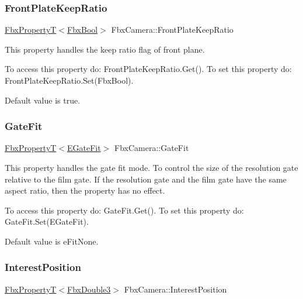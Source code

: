 \subsubsection{\texorpdfstring{Front\+Plate\+Keep\+Ratio}{FrontPlateKeepRatio}}
{\footnotesize\ttfamily \hyperlink{class_fbx_property_t}{Fbx\+PropertyT}$<$\hyperlink{fbxtypes_8h_a92e0562b2fe33e76a242f498b362262e}{Fbx\+Bool}$>$ Fbx\+Camera\+::\+Front\+Plate\+Keep\+Ratio}

This property handles the keep ratio flag of front plane.

To access this property do\+: Front\+Plate\+Keep\+Ratio.\+Get(). To set this property do\+: Front\+Plate\+Keep\+Ratio.\+Set(\+Fbx\+Bool).

Default value is true. \mbox{\label{class_fbx_camera_a72892e0ca040266ffc5ede12235db68a}} 
\subsubsection{\texorpdfstring{Gate\+Fit}{GateFit}}
{\footnotesize\ttfamily \hyperlink{class_fbx_property_t}{Fbx\+PropertyT}$<$\hyperlink{class_fbx_camera_aeef0bf29c16fe5f08815fb33402330dd}{E\+Gate\+Fit}$>$ Fbx\+Camera\+::\+Gate\+Fit}

This property handles the gate fit mode. To control the size of the resolution gate relative to the film gate. If the resolution gate and the film gate have the same aspect ratio, then the property has no effect.

To access this property do\+: Gate\+Fit.\+Get(). To set this property do\+: Gate\+Fit.\+Set(\+E\+Gate\+Fit).

Default value is e\+Fit\+None. \mbox{\label{class_fbx_camera_a686036fc4f1794fe7f3b74f978e8d174}} 
\subsubsection{\texorpdfstring{Interest\+Position}{InterestPosition}}
{\footnotesize\ttfamily \hyperlink{class_fbx_property_t}{Fbx\+PropertyT}$<$\hyperlink{fbxtypes_8h_ae0a96f14cde566774c7553aa7523b7a7}{Fbx\+Double3}$>$ Fbx\+Camera\+::\+Interest\+Position}

